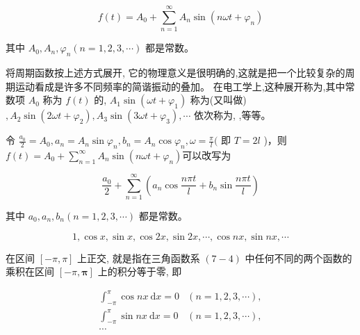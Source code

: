$$ f(t)=A_{0}+\sum_{n=1}^{\infty} A_{n} \sin \left(n \omega t+\varphi_{n}\right) $$

其中 $ A_{0}, A_{n}, \varphi_{n}(n=1,2,3, \cdots) $ 都是常数。

将周期函数按上述方式展开, 它的物理意义是很明确的,这就是把一个比较复杂的周期运动看成是许多不同频率的简谐振动的叠加。 在电工学上,这种展开称为,其中常数项 $ A_{0} $ 称为 $ f(t) $ 的, $ A_{1} \sin \left(\omega t+\varphi_{1}\right) $ 称为(又叫做) $ , A_{2} \sin \left(2 \omega t+\varphi_{2}\right), A_{3} \sin \left(3 \omega t+\varphi_{3}\right), \cdots $ 依次称为, ,等等。

\begin{definition}[三角级数]
    令 $ \frac{a_{0}}{2}=A_{0}, a_{n}=A_{n} \sin \varphi_{n}, b_{n}=A_{n} \cos \varphi_{n}, \omega=\frac{\pi}{l}( $ 即 $ T=2 l $ )，则$ f(t)=A_{0}+\sum_{n=1}^{\infty} A_{n} \sin \left(n \omega t+\varphi_{n}\right) $可以改写为

    $$ \frac{a_{0}}{2}+\sum_{n=1}^{\infty}\left(a_{n} \cos \frac{n \pi t}{l}+b_{n} \sin \frac{n \pi t}{l}\right) $$

    其中 $ a_{0}, a_{n}, b_{n}(n=1,2,3, \cdots) $ 都是常数。 
\end{definition}

\begin{definition}[三角函数系（基波）]
    $$ 1, \cos x, \sin x, \cos 2 x, \sin 2 x, \cdots, \cos n x, \sin n x, \cdots $$

    在区间 $ [-\pi, \pi] $ 上正交, 就是指在三角函数系 $ (7-4) $ 中任何不同的两个函数的 乘积在区间 $ [-\pi, \boldsymbol{\pi}] $ 上的积分等于零, 即

    $$ \begin{array}{ll}\int_{-\pi}^{\pi} \cos n x \mathrm{~d} x=0 & (n=1,2,3, \cdots), \\ \int_{-\pi}^{\pi} \sin n x \mathrm{~d} x=0 & (n=1,2,3, \cdots),\\ \cdots
    \end{array} $$
\end{definition}

